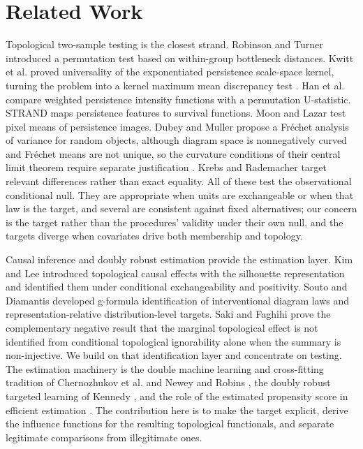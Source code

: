 \section{Related Work}
\label{sec:related}

Topological two-sample testing is the closest strand. Robinson and Turner \cite{robinson_turner_2017} introduced a permutation test based on within-group bottleneck distances. Kwitt et al. \cite{kwitt_neurips_2015} proved universality of the exponentiated persistence scale-space kernel, turning the problem into a kernel maximum mean discrepancy test \cite{gretton_2012}. Han et al. \cite{han_kim_kim_2026} compare weighted persistence intensity functions with a permutation U-statistic. STRAND \cite{murris_strand_2026} maps persistence features to survival functions. Moon and Lazar \cite{moon_lazar_2023} test pixel means of persistence images. Dubey and Muller \cite{dubey_muller_2019} propose a Fr\'echet analysis of variance for random objects, although diagram space is nonnegatively curved and Fr\'echet means are not unique, so the curvature conditions of their central limit theorem require separate justification \cite{mileyko_2011,turner_2014,che_jact_2024}. Krebs and Rademacher \cite{krebs_rademacher_2024} target relevant differences rather than exact equality. All of these test the observational conditional null. They are appropriate when units are exchangeable or when that law is the target, and several are consistent against fixed alternatives; our concern is the target rather than the procedures' validity under their own null, and the targets diverge when covariates drive both membership and topology.

Causal inference and doubly robust estimation provide the estimation layer. Kim and Lee \cite{kim_lee_tce_2026} introduced topological causal effects with the silhouette representation and identified them under conditional exchangeability and positivity. Souto and Diamantis \cite{souto_diamantis_tcda_2026} developed g-formula identification of interventional diagram laws and representation-relative distribution-level targets. Saki and Faghihi \cite{saki_faghihi_2026} prove the complementary negative result that the marginal topological effect is not identified from conditional topological ignorability alone when the summary is non-injective. We build on that identification layer and concentrate on testing. The estimation machinery is the double machine learning and cross-fitting tradition of Chernozhukov et al. \cite{chernozhukov_dml_2018} and Newey and Robins \cite{new_robins_2018}, the doubly robust targeted learning of Kennedy \cite{kennedy_drlearner_2023,kennedy_review_2022}, and the role of the estimated propensity score in efficient estimation \cite{hirano_imbens_ridder_2003,hahn_1998}. The contribution here is to make the target explicit, derive the influence functions for the resulting topological functionals, and separate legitimate comparisons from illegitimate ones.

